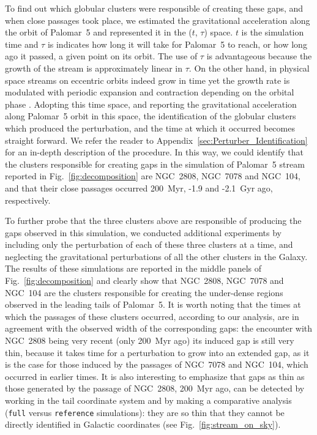 \documentclass[draft]{aa}
\begin{document}
    To find out which globular clusters were responsible of creating these gaps, and when close passages took place, we estimated the gravitational acceleration along the orbit of Palomar~5 and represented it in the ($t$, $\tau$) space. $t$ is the simulation time and $\tau$ is indicates how long it will take for Palomar~5 to reach, or how  long ago it passed, a given point on its orbit. The use of $\tau$ is advantageous because the growth of the stream is approximately linear in $\tau$. On the other hand, in physical space streams on eccentric orbits indeed grow in time yet the growth rate is modulated with periodic expansion and contraction depending on the orbital phase \citep[see the top panel of Fig.~5.][for an example]{2016MNRAS.457.3817S}. Adopting this time space, and reporting the gravitational acceleration along Palomar~5 orbit in this space, the identification of the globular clusters which produced the perturbation, and the time at which it occurred becomes straight forward. We refer the reader to Appendix~\ref{sec:Perturber_Identification} for an in-depth description of the procedure. In this way, we could identify that the clusters responsible for creating gaps in the simulation of Palomar~5 stream reported in Fig.~\ref{fig:decomposition} are NGC~2808, NGC~7078 and NGC~104, and that their close passages occurred 200~Myr, -1.9 and -2.1~Gyr ago, respectively. 
    
    To further probe that the three clusters above are responsible of producing the gaps observed in this simulation, we conducted additional experiments by including only the perturbation of each of these three clusters at a time, and neglecting the gravitational perturbations of all the other clusters in the Galaxy. The results of these simulations are reported in the middle panels of Fig.~\ref{fig:decomposition} and clearly show that NGC~2808, NGC~7078 and NGC~104 are the clusters responsible for creating the under-dense regions observed in the leading tails of Palomar~5. It is worth noting that the times at which the passages of these clusters occurred, according to our analysis, are in agreement with the observed width of the corresponding gaps: the encounter with NGC~2808 being very recent (only 200~Myr ago) its induced gap is still very thin, because it takes time for a perturbation to grow into an extended gap, as it is the case for those induced by the passages of  NGC~7078 and NGC~104, which occurred in earlier times. It is also interesting to emphasize that gaps as thin as those generated by the passage of NGC~2808, 200~Myr ago, can be detected by working in the tail coordinate system and by making a comparative analysis (\texttt{full} versus \texttt{reference} simulations): they are so thin that they cannot be directly identified in Galactic coordinates (see Fig.~\ref{fig:stream_on_sky}).\\
\end{document}
